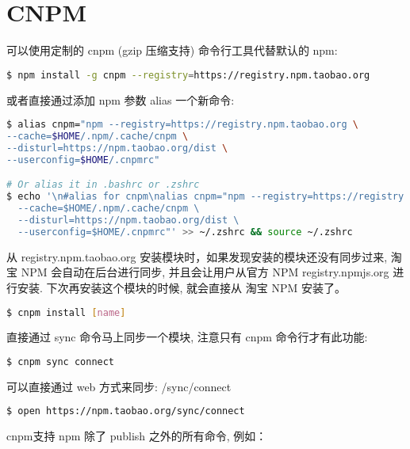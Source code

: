\begin{lstlisting}[language=bash]

\end{lstlisting}



\section{CNPM}

可以使用定制的 cnpm (gzip 压缩支持) 命令行工具代替默认的 npm:

\begin{lstlisting}[language=bash]
$ npm install -g cnpm --registry=https://registry.npm.taobao.org
\end{lstlisting}

或者直接通过添加 npm 参数 alias 一个新命令:

\begin{lstlisting}[language=bash]
$ alias cnpm="npm --registry=https://registry.npm.taobao.org \
--cache=$HOME/.npm/.cache/cnpm \
--disturl=https://npm.taobao.org/dist \
--userconfig=$HOME/.cnpmrc"

# Or alias it in .bashrc or .zshrc
$ echo '\n#alias for cnpm\nalias cnpm="npm --registry=https://registry.npm.taobao.org \
  --cache=$HOME/.npm/.cache/cnpm \
  --disturl=https://npm.taobao.org/dist \
  --userconfig=$HOME/.cnpmrc"' >> ~/.zshrc && source ~/.zshrc
\end{lstlisting}

从 registry.npm.taobao.org 安装模块时，如果发现安装的模块还没有同步过来, 淘宝 NPM 会自动在后台进行同步, 并且会让用户从官方 NPM registry.npmjs.org 进行安装. 下次再安装这个模块的时候, 就会直接从 淘宝 NPM 安装了。


\begin{lstlisting}[language=bash]
$ cnpm install [name]
\end{lstlisting}

直接通过 sync 命令马上同步一个模块, 注意只有 cnpm 命令行才有此功能:

\begin{lstlisting}[language=bash]
$ cnpm sync connect
\end{lstlisting}

可以直接通过 web 方式来同步: /sync/connect

\begin{lstlisting}[language=bash]
$ open https://npm.taobao.org/sync/connect
\end{lstlisting}


cnpm支持 npm 除了 publish 之外的所有命令, 例如：

